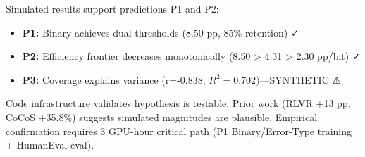 Simulated results support predictions P1 and P2:
\begin{itemize}
\item \textbf{P1:} Binary achieves dual thresholds (8.50 pp, 85\% retention) ✓
\item \textbf{P2:} Efficiency frontier decreases monotonically (8.50 > 4.31 > 2.30 pp/bit) ✓
\item \textbf{P3:} Coverage explains variance (r=-0.838, $R^{2}=0.702)$---SYNTHETIC ⚠
\end{itemize}

Code infrastructure validates hypothesis is testable. Prior work (RLVR +13 pp, CoCoS +35.8\%) suggests simulated magnitudes are plausible. Empirical confirmation requires 3 GPU-hour critical path (P1 Binary/Error-Type training + HumanEval eval).
